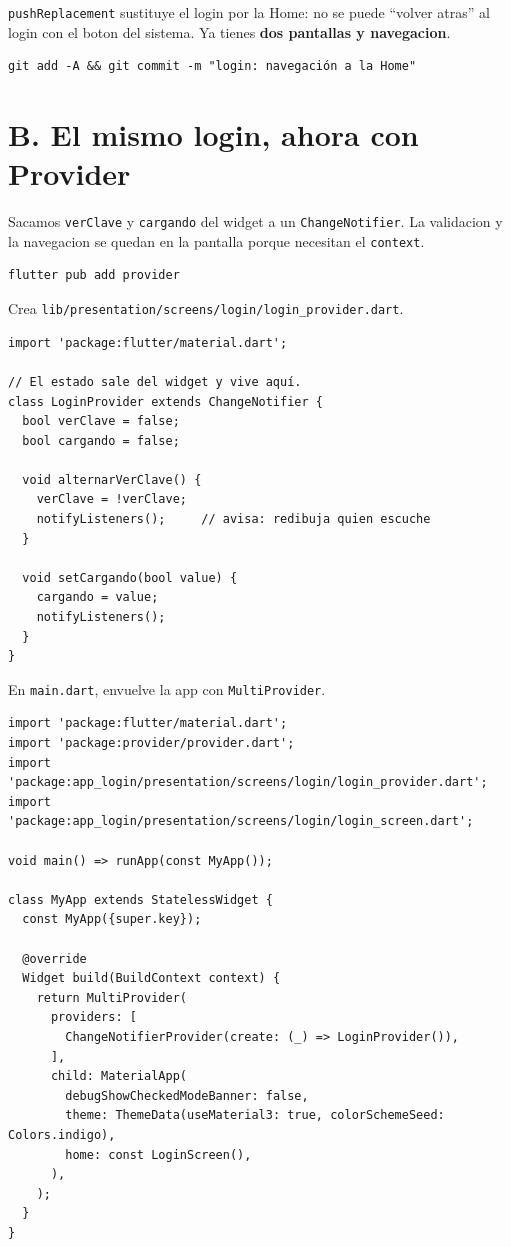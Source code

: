 \documentclass[11pt,a4paper,oneside]{book}
\newcommand{\file}[1]{\texttt{\textcolor{brandDark}{#1}}}
\begin{document}
\begin{whatbox}
\texttt{pushReplacement} sustituye el login por la Home: no se puede ``volver atras''
al login con el boton del sistema. Ya tienes \textbf{dos pantallas y navegacion}.
\end{whatbox}

\begin{lstlisting}[language={},numbers=none]
git add -A && git commit -m "login: navegación a la Home"
\end{lstlisting}

\section*{B. El mismo login, ahora con Provider}

Sacamos \texttt{verClave} y \texttt{cargando} del widget a un \texttt{ChangeNotifier}.
La validacion y la navegacion se quedan en la pantalla porque necesitan el
\texttt{context}.

\begin{lstlisting}[language={},numbers=none]
flutter pub add provider
\end{lstlisting}

\begin{wherebox}
Crea \file{lib/presentation/screens/login/login\_provider.dart}.
\end{wherebox}

\begin{lstlisting}
import 'package:flutter/material.dart';

// El estado sale del widget y vive aquí.
class LoginProvider extends ChangeNotifier {
  bool verClave = false;
  bool cargando = false;

  void alternarVerClave() {
    verClave = !verClave;
    notifyListeners();     // avisa: redibuja quien escuche
  }

  void setCargando(bool value) {
    cargando = value;
    notifyListeners();
  }
}
\end{lstlisting}

\begin{wherebox}
En \file{main.dart}, envuelve la app con \texttt{MultiProvider}.
\end{wherebox}

\begin{lstlisting}
import 'package:flutter/material.dart';
import 'package:provider/provider.dart';
import 'package:app_login/presentation/screens/login/login_provider.dart';
import 'package:app_login/presentation/screens/login/login_screen.dart';

void main() => runApp(const MyApp());

class MyApp extends StatelessWidget {
  const MyApp({super.key});

  @override
  Widget build(BuildContext context) {
    return MultiProvider(
      providers: [
        ChangeNotifierProvider(create: (_) => LoginProvider()),
      ],
      child: MaterialApp(
        debugShowCheckedModeBanner: false,
        theme: ThemeData(useMaterial3: true, colorSchemeSeed: Colors.indigo),
        home: const LoginScreen(),
      ),
    );
  }
}
\end{lstlisting}
\end{document}
